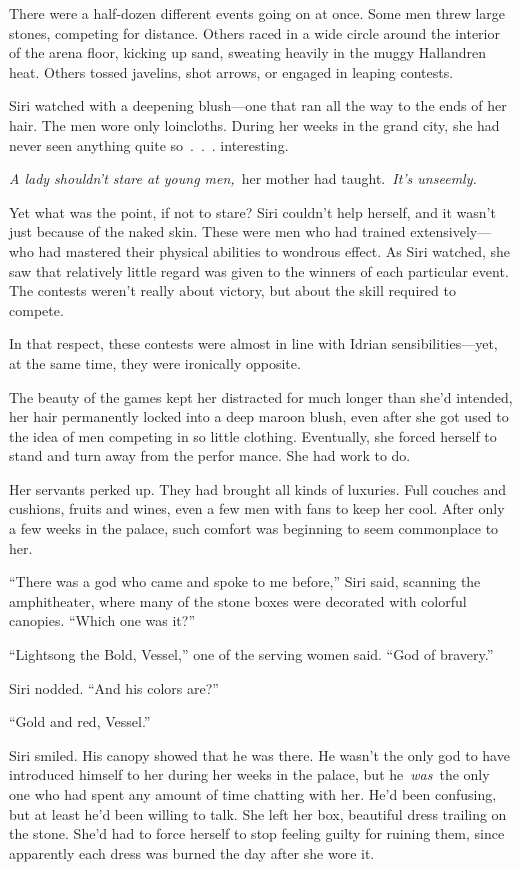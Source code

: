 There were a half-dozen different events going on at once. Some men threw large stones, competing for distance. Others raced in a wide circle around the interior of the arena floor, kicking up sand, sweating heavily in the muggy Hallandren heat. Others tossed javelins, shot arrows, or engaged in leaping contests.

Siri watched with a deepening blush—one that ran all the way to the ends of her hair. The men wore only loincloths. During her weeks in the grand city, she had never seen anything quite so~.~.~. interesting.

\textit{A lady shouldn’t stare at young men,}~her mother had taught.~\textit{It’s unseemly.}

Yet what was the point, if not to stare? Siri couldn’t help herself, and it wasn’t just because of the naked skin. These were men who had trained extensively—who had mastered their physical abilities to wondrous effect. As Siri watched, she saw that relatively little regard was given to the winners of each particular event. The contests weren’t really about victory, but about the skill required to compete.

In that respect, these contests were almost in line with Idrian sensibilities—yet, at the same time, they were ironically opposite.

The beauty of the games kept her distracted for much longer than she’d intended, her hair permanently locked into a deep maroon blush, even after she got used to the idea of men competing in so little clothing. Eventually, she forced herself to stand and turn away from the perfor mance. She had work to do.

Her servants perked up. They had brought all kinds of luxuries. Full couches and cushions, fruits and wines, even a few men with fans to keep her cool. After only a few weeks in the palace, such comfort was beginning to seem commonplace to her.

“There was a god who came and spoke to me before,” Siri said, scanning the amphitheater, where many of the stone boxes were decorated with colorful canopies. “Which one was it?”

“Lightsong the Bold, Vessel,” one of the serving women said. “God of bravery.”

Siri nodded. “And his colors are?”

“Gold and red, Vessel.”

Siri smiled. His canopy showed that he was there. He wasn’t the only god to have introduced himself to her during her weeks in the palace, but he~\textit{was}~the only one who had spent any amount of time chatting with her. He’d been confusing, but at least he’d been willing to talk. She left her box, beautiful dress trailing on the stone. She’d had to force herself to stop feeling guilty for ruining them, since apparently each dress was burned the day after she wore it.

